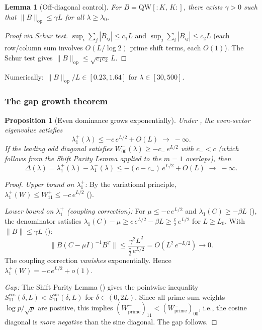 \documentclass[12pt,a4paper]{article}
\newtheorem{lemma}[theorem]{Lemma}
\newtheorem{proposition}[theorem]{Proposition}
\theoremstyle{definition}
\theoremstyle{remark}
\begin{document}
\begin{lemma}[Off-diagonal control]
\label{lem:L3}
For $B = \mathrm{QW}[{:}K,\,K{:}]$, there exists $\gamma > 0$ such that $\|B\|_{\mathrm{op}} \leq \gamma L$ for all $\lambda \geq \lambda_0$.
\end{lemma}
\begin{proof}[Proof via Schur test]
$\sup_i \sum_j |B_{ij}| \leq c_1 L$ and $\sup_j \sum_i |B_{ij}| \leq c_2 L$ (each row/column sum involves $O(L/\log 2)$ prime shift terms, each $O(1)$). The Schur test gives $\|B\|_{\mathrm{op}} \leq \sqrt{c_1 c_2}\,L$.
\end{proof}

\noindent Numerically: $\|B\|_{\mathrm{op}}/L \in [0.23, 1.64]$ for $\lambda \in [30, 500]$.

\subsubsection{The gap growth theorem}

\begin{proposition}[Even dominance grows exponentially]
\label{prop:gap-growth}
Under , the even-sector eigenvalue satisfies
\[
  \lambda_1^+(\lambda) \leq -c\,e^{L/2} + O(L) \;\to\; -\infty.
\]
If the leading odd diagonal satisfies $W_{00}^-(\lambda) \geq -c_-\,e^{L/2}$ with $c_- < c$ (which follows from the Shift Parity Lemma applied to the $m=1$ overlaps), then
\begin{equation}
\label{eq:gap-exp}
  \Delta(\lambda) = \lambda_1^+(\lambda) - \lambda_1^-(\lambda) \leq -(c - c_-)\,e^{L/2} + O(L) \;\to\; -\infty.
\end{equation}
\end{proposition}

\begin{proof}
\emph{Upper bound on $\lambda_1^+$:} By the variational principle, $\lambda_1^+(W) \leq W_{11}^+ \leq -c\,e^{L/2}$ ().

\emph{Lower bound on $\lambda_1^+$ (coupling correction):} For $\mu \leq -c\,e^{L/2}$ and $\lambda_1(C) \geq -\beta L$ (), the denominator satisfies $\lambda_1(C) - \mu \geq c\,e^{L/2} - \beta L \geq \tfrac{c}{2}\,e^{L/2}$ for $L \geq L_0$. With $\|B\| \leq \gamma L$ ():
\[
  \|B(C - \mu I)^{-1}B^T\| \leq \frac{\gamma^2 L^2}{\frac{c}{2}\,e^{L/2}} = O(L^2\,e^{-L/2}) \to 0.
\]
The coupling correction \emph{vanishes} exponentially. Hence $\lambda_1^+(W) = -c\,e^{L/2} + o(1)$.

\emph{Gap:} The Shift Parity Lemma () gives the pointwise inequality $S_{11}^{\cos}(\delta, L) < S_{11}^{\sin}(\delta, L)$ for $\delta \in (0, 2L)$. Since all prime-sum weights $\log p / \sqrt{p}$ are positive, this implies $(W_{\mathrm{prime}}^+)_{11} < (W_{\mathrm{prime}}^-)_{00}$, i.e., the cosine diagonal is \emph{more negative} than the sine diagonal. The gap follows.
\end{proof}
\end{document}
